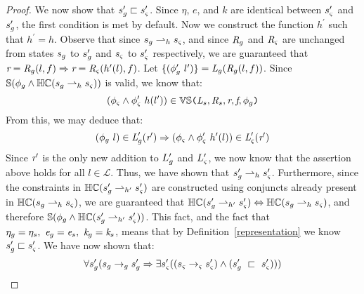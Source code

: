 \begin{proof}
We now show that $s_{g}^\prime \sqsubset s_{\varsigma}^\prime$. Since $\eta$, $e$, and $k$ are identical between $s_{\varsigma}^\prime$ and $s_{g}^\prime $, the first condition is met by default. Now we construct the function $h^\prime$ such that $h^\prime = h$. Observe that since $s_{g} \rightharpoonup_{h} s_{\varsigma}$, and since $\emph{R}_{g}$ and $\emph{R}_{\varsigma}$ are unchanged from states $s_{g}$ to $s_{g}^\prime$ and $s_{\varsigma}$ to $s_{\varsigma}^\prime$ respectively, we are guaranteed that $ \emph{r} = \emph{R}_{g}(l,f) \Rightarrow \emph{r} = \emph{R}_{\varsigma}(h^\prime(l),f)$. Let $\{(\phi_{g}^\prime\ l^\prime)\} =  \emph{L}_{g}(\emph{R}_{g}(l,f))$. Since $\mathbb{S}(\phi_g \wedge \mathbb{HC}(s_{g} \rightharpoonup_{h} s_{\varsigma}))$ is valid, we know that:
 $$(\phi_{\varsigma} \wedge \phi_{\varsigma}^\prime\ h(l^\prime)) \in \mathbb{VS}\texttt{(} \emph{L}_{s},\emph{R}_{s},\emph{r},\emph{f},\phi_g\texttt{)}$$ 
From this, we may deduce that:
$$ (\phi_{g}\ l) \in \emph{L}_{g}^\prime(\emph{r}^\prime) \Rightarrow (\phi_{\varsigma} \wedge \phi_{\varsigma}^\prime\ h^\prime(l))\in \emph{L}_{\varsigma}^\prime(\emph{r}^\prime)$$
Since $\emph{r}^\prime$ is the only new addition to $L_{g}^\prime$ and $L_{\varsigma}^\prime$, we now know that the assertion above holds for all $l \in \mathcal{L}$. Thus, we have shown that $s_{g}^\prime \rightharpoonup_{h} s_{\varsigma}^\prime$. Furthermore, since the constraints in $\mathbb{HC}(s_{g}^\prime \rightharpoonup_{h^\prime} s_{\varsigma}^\prime)$ are constructed using conjuncts already present in $ \mathbb{HC}(s_{g} \rightharpoonup_{h} s_{\varsigma})$, we are guaranteed that $\mathbb{HC}(s_{g}^\prime \rightharpoonup_{h^\prime} s_{\varsigma}^\prime) \Leftrightarrow \mathbb{HC}(s_{g} \rightharpoonup_{h} s_{\varsigma})$, and therefore $\mathbb{S}(\phi_g \wedge \mathbb{HC}(s_{g}^\prime \rightharpoonup_{h^\prime} s_{\varsigma}^\prime))$. This fact, and the fact that $\eta_{g} = \eta_{s} ,\ \emph{e}_{g} = \emph{e}_{s} ,\ \emph{k}_{g} = \emph{k}_{s}$, means that by Definition~\ref{representation} we know $s_{g}^\prime \sqsubset s_{\varsigma}^\prime$. We have now shown that:
\begin{equation}
\forall s_{g}^\prime ( s_{g} \rightarrow_{g} s_{g}^\prime \Rightarrow \exists s_{\varsigma}^\prime( (s_{\varsigma} \rightarrow_{\varsigma} s_{\varsigma}^\prime )\wedge (s_{g}^\prime\ \sqsubset\ s_{\varsigma}^\prime ))  )
\end{equation}



\end{proof}
